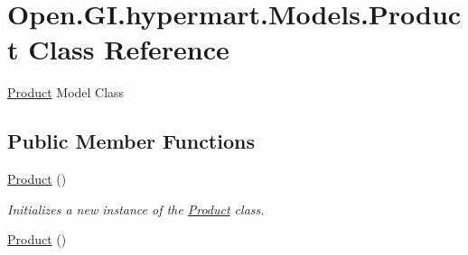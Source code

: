 \hypertarget{class_open_1_1_g_i_1_1hypermart_1_1_models_1_1_product}{}\section{Open.\+G\+I.\+hypermart.\+Models.\+Product Class Reference}
\label{class_open_1_1_g_i_1_1hypermart_1_1_models_1_1_product}


\hyperlink{class_open_1_1_g_i_1_1hypermart_1_1_models_1_1_product}{Product} Model Class  


\subsection*{Public Member Functions}
\begin{DoxyCompactItemize}
\item 
\hyperlink{class_open_1_1_g_i_1_1hypermart_1_1_models_1_1_product_a6e3b824c07f190baa506f9c73da63e62}{Product} ()
\begin{DoxyCompactList}\small\item\em Initializes a new instance of the \hyperlink{class_open_1_1_g_i_1_1hypermart_1_1_models_1_1_product}{Product} class. \end{DoxyCompactList}\item 
\hyperlink{class_open_1_1_g_i_1_1hypermart_1_1_models_1_1_product_a6e3b824c07f190baa506f9c73da63e62}{Product} ()
\end{DoxyCompactItemize}
